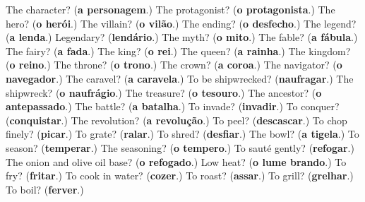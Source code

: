 \begin{tcolorbox}[breakable,colback=teal!4,colframe=teal!35!black,title={Before you move on}]
The character? (\textbf{a personagem}.) The protagonist? (\textbf{o protagonista}.) The hero? (\textbf{o herói}.) The villain? (\textbf{o vilão}.) The ending? (\textbf{o desfecho}.) The legend? (\textbf{a lenda}.) Legendary? (\textbf{lendário}.) The myth? (\textbf{o mito}.) The fable? (\textbf{a fábula}.) The fairy? (\textbf{a fada}.) The king? (\textbf{o rei}.) The queen? (\textbf{a rainha}.) The kingdom? (\textbf{o reino}.) The throne? (\textbf{o trono}.) The crown? (\textbf{a coroa}.) The navigator? (\textbf{o navegador}.) The caravel? (\textbf{a caravela}.) To be shipwrecked? (\textbf{naufragar}.) The shipwreck? (\textbf{o naufrágio}.) The treasure? (\textbf{o tesouro}.) The ancestor? (\textbf{o antepassado}.) The battle? (\textbf{a batalha}.) To invade? (\textbf{invadir}.) To conquer? (\textbf{conquistar}.) The revolution? (\textbf{a revolução}.) To peel? (\textbf{descascar}.) To chop finely? (\textbf{picar}.) To grate? (\textbf{ralar}.) To shred? (\textbf{desfiar}.) The bowl? (\textbf{a tigela}.) To season? (\textbf{temperar}.) The seasoning? (\textbf{o tempero}.) To sauté gently? (\textbf{refogar}.) The onion and olive oil base? (\textbf{o refogado}.) Low heat? (\textbf{o lume brando}.) To fry? (\textbf{fritar}.) To cook in water? (\textbf{cozer}.) To roast? (\textbf{assar}.) To grill? (\textbf{grelhar}.) To boil? (\textbf{ferver}.)
\end{tcolorbox}
